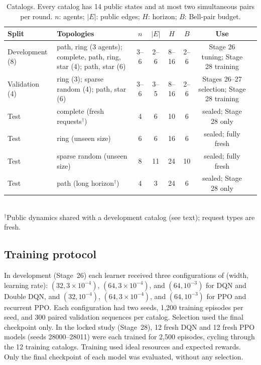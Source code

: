 \documentclass[11pt,a4paper]{article}
\begin{document}
\begin{table}[t]
\centering
\caption{Catalogs. Every catalog has 14 public states and at most two simultaneous pairs per round. $n$: agents; $|E|$: public edges; $H$: horizon; $B$: Bell-pair budget.}
\label{tab:catalogs}
\small
\begin{tabularx}{\textwidth}{@{}l>{\raggedright\arraybackslash}Xccccc>{\raggedright\arraybackslash}p{30mm}@{}}
\toprule
Split & Topologies & $n$ & $|E|$ & $H$ & $B$ & Use \\
\midrule
Development (8) & path, ring (3 agents); complete, path, ring, star (4); path, star (6) & 3--6 & 2--6 & 8--16 & 2--6 & Stage 26 tuning; Stage 28 training \\
Validation (4) & ring (3); sparse random (4); path, star (6) & 3--6 & 3--5 & 8--16 & 2--6 & Stages 26--27 selection; Stage 28 training \\
\midrule
Test & complete (fresh requests$^\dagger$) & 4 & 6 & 10 & 6 & sealed; Stage 28 only \\
Test & ring (unseen size) & 6 & 6 & 16 & 6 & sealed; fully fresh \\
Test & sparse random (unseen size) & 8 & 11 & 24 & 10 & sealed; fully fresh \\
Test & path (long horizon$^\dagger$) & 4 & 3 & 24 & 6 & sealed; Stage 28 only \\
\bottomrule
\end{tabularx}\\[2pt]
{\footnotesize $^\dagger$Public dynamics shared with a development catalog (see text); request types are fresh.}
\end{table}

\subsection{Training protocol}\label{sec:training}

In development (Stage~26) each learner received three configurations of (width, learning rate): $(32,3{\times}10^{-4})$, $(64,3{\times}10^{-4})$, and $(64,10^{-3})$ for DQN and Double DQN, and $(32,10^{-4})$, $(64,3{\times}10^{-4})$, and $(64,10^{-3})$ for PPO and recurrent PPO. Each configuration had two seeds, 1{,}200 training episodes per seed, and 300 paired validation sequences per catalog. Selection used the final checkpoint only. In the locked study (Stage~28), 12 fresh DQN and 12 fresh PPO models (seeds 28000--28011) were each trained for 2{,}500 episodes, cycling through the 12 training catalogs. Training used ideal resources and expected rewards. Only the final checkpoint of each model was evaluated, without any selection.
\end{document}

